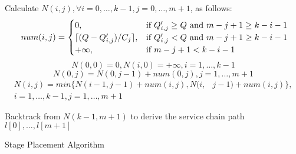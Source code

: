 \begin{algorithm}[!t]
\KwIn{The shortest-delay datacenter path $d[0...k-1]$ as a list of distinct datacenter indices between entry-exit datacenter pair ($d[0], d[k-1]$)
; DP service chain with $m+2$ stages (augmented with virtual entry and exit stage discussed in Sec.~\ref{sec:dp-service-chain-path}) and per-instance capacity $C_j, 0 \leq j \leq m+1$, of stage-$j$ VNF; %
 overall processing capacities $Q'_{i,j}$ of all stage-$j$ VNF instances in datacenter $d[i]$; predicted workload $Q$ for entry-exit datacenter pair $(d[0], d[k-1])$}


{Calculate $N(i,j), \forall i=0,\ldots,k-1, j=0, \ldots, m+1$, as follows:
\begin{equation}
\resizebox{0.95\columnwidth}{!}{
$num(i,j)=
  \begin{cases}
    0,                                        &\text{if $Q'_{i,j} \geq Q$ and $m-j+1 \geq k-i-1$}\\
    \lceil(Q-Q'_{i,j})/C_j\rceil, &\text{if $Q'_{i,j}<Q$ and $m-j+1 \geq k-i-1$}\\
    +\infty,                                &\text{if $m-j+1<k-i-1$}
  \end{cases}$}
 \label{eq6}
\end{equation}
\begin{equation}
N(0, 0) = 0, N(i, 0) = +\infty, i=1,\ldots,k-1 %
\label{eq2}
\end{equation}
\begin{equation}
N(0, j) =  N(0, j-1)+num(0,j), j=1, \ldots, m+1%
\label{eq3}
\end{equation}
\begin{equation}
\begin{aligned}
 N(i, j) = min\{ N(i-1, j-1)+num(i, j), N(i, & j-1) +num(i,j) \}, \\
 i=1,\ldots,k-1, j=1, \ldots, m+1 %
\end{aligned}
\label{eq5}
\end{equation}
}%


{Backtrack from $N(k-1, m+1)$ to derive the service chain path $l[0], \ldots, l[m+1]$}\;

\;

\caption{Stage Placement Algorithm}
\label{algo:sp}
\end{algorithm}

